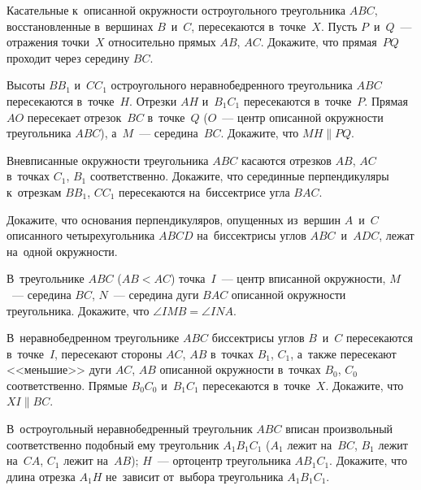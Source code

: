 


\begin{problems}

\item
Касательные к~описанной окружности остроугольного треугольника $ABC$,
восстановленные в~вершинах $B$~и~$C$, пересекаются в~точке~$X$.
Пусть $P$~и~$Q$~--- отражения точки~$X$ относительно прямых $AB$, $AC$.
Докажите, что прямая~$PQ$ проходит через середину $BC$.

\item
Высоты $BB_{1}$ и~$CC_{1}$ остроугольного неравнобедренного треугольника $ABC$
пересекаются в~точке~$H$.
Отрезки $AH$ и~$B_{1}C_{1}$ пересекаются в~точке~$P$.
Прямая~$AO$ пересекает отрезок~$BC$ в~точке~$Q$
($O$~--- центр описанной окружности треугольника $ABC$),
а~$M$~--- середина~$BC$.
Докажите, что $MH \parallel PQ$.

\item
Вневписанные окружности треугольника $ABC$ касаются отрезков $AB$, $AC$
в~точках $C_1$, $B_1$ соответственно.
Докажите, что серединные перпендикуляры к~отрезкам $BB_{1}$, $CC_{1}$
пересекаются на~биссектрисе угла $BAC$.

\item
Докажите, что основания перпендикуляров, опущенных из~вершин $A$~и~$C$
описанного четырехугольника $ABCD$ на~биссектрисы углов $ABC$~и~$ADC$, лежат
на~одной окружности.

\item
В~треугольнике $ABC$ ($AB < AC$) точка~$I$~--- центр вписанной окружности,
$M$~--- середина $BC$, $N$~--- середина дуги $BAC$ описанной окружности
треугольника.
Докажите, что $\angle IMB = \angle INA$.

\item
В~неравнобедренном треугольнике $ABC$ биссектрисы углов $B$~и~$C$ пересекаются
в~точке~$I$, пересекают стороны $AC$, $AB$ в~точках $B_1$, $C_1$, а~также
пересекают <<меньшие>> дуги $AC$, $AB$ описанной окружности
в~точках $B_0$, $C_0$ соответственно.
Прямые $B_{0}C_{0}$ и~$B_{1}C_{1}$ пересекаются в~точке~$X$.
Докажите, что $XI \parallel BC$.

\item
В~остроугольный неравнобедренный треугольник $ABC$ вписан произвольный
соответственно подобный ему треугольник $A_{1}B_{1}C_{1}$
($A_1$ лежит на~$BC$, $B_1$ лежит на~$CA$, $C_1$ лежит на~$AB$);
$H$~--- ортоцентр треугольника $AB_{1}C_{1}$.
Докажите, что длина отрезка $A_{1}H$ не~зависит от~выбора
треугольника $A_{1}B_{1}C_{1}$.


\end{problems}
